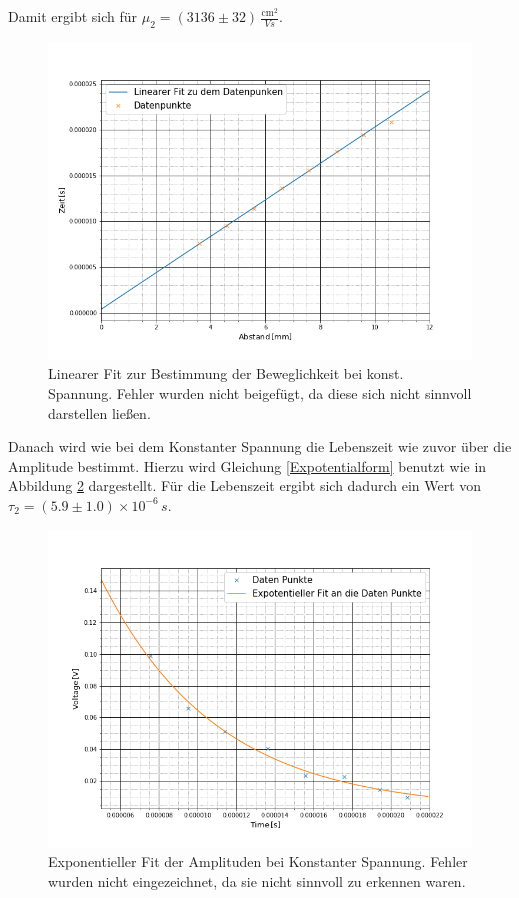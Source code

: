 	Damit ergibt sich für $\mu_2=(3136 \pm 32)\,\frac{\text{cm}^2}{Vs}$.\par
	\begin{figure}[ht]
		\includegraphics[scale=0.5]{Bild/V2Spannung2}
		\centering
		\caption[Linearer Fit zur Bestimmung der Beweglichkeit bei konst. Spannung]{\small Linearer Fit zur Bestimmung der Beweglichkeit bei konst. Spannung. Fehler wurden nicht beigefügt, da diese sich nicht sinnvoll darstellen ließen.}
		\label{Abstand}
	\end{figure}
	Danach wird wie bei dem Konstanter Spannung die Lebenszeit wie zuvor über die Amplitude bestimmt. Hierzu wird Gleichung \ref{Expotentialform} benutzt wie in Abbildung \ref{AbstandTau} dargestellt. Für die Lebenszeit ergibt sich dadurch ein Wert von $\tau_2= \left(5.9 \pm 1.0\right) \times 10^{-6}\,s$.\par
	\begin{figure}[ht]
		\includegraphics[scale=0.5]{Bild/V2Spannung3}
		\centering
		\caption[Exponentieller Fit der Amplituden bei konstanter Spannung]{\small Exponentieller Fit der Amplituden bei Konstanter Spannung. Fehler wurden nicht eingezeichnet, da sie nicht sinnvoll zu erkennen waren.}
		\label{AbstandTau}
	\end{figure} 
